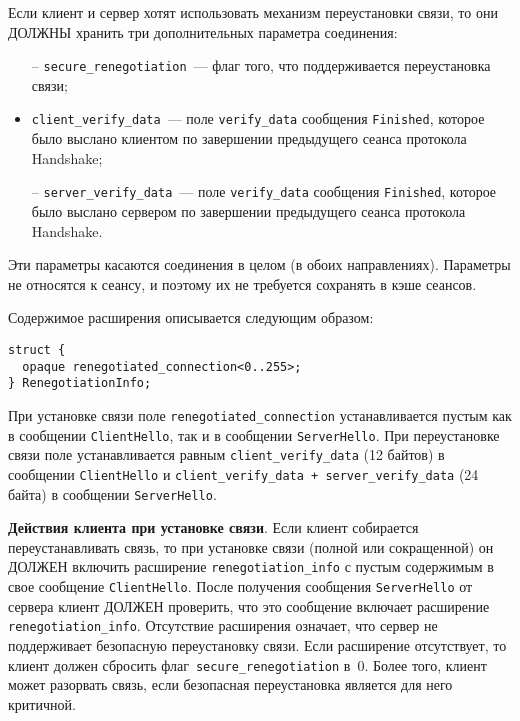 Если клиент и сервер хотят использовать механизм переустановки связи, то 
они ДОЛЖНЫ хранить три дополнительных параметра соединения: 
\begin{itemize}
\item[--]
\lstinline{secure_renegotiation}~--- флаг того, что поддерживается 
переустановка связи;

\item[--]
\lstinline{client_verify_data}~--- поле \lstinline{verify_data} 
сообщения \lstinline{Finished}, которое было выслано клиентом по 
завершении предыдущего сеанса протокола Handshake; 

\item[--]
\lstinline{server_verify_data}~--- поле \lstinline{verify_data} 
сообщения \lstinline{Finished}, которое было выслано сервером по 
завершении предыдущего сеанса протокола Handshake. 
\end{itemize}

Эти параметры касаются соединения в целом (в обоих направлениях). Параметры 
не относятся к сеансу, и поэтому их не требуется сохранять в кэше сеансов. 

Содержимое расширения описывается следующим образом:
\begin{lstlisting}
struct {
  opaque renegotiated_connection<0..255>;
} RenegotiationInfo;
\end{lstlisting}
                
При установке связи поле \lstinline{renegotiated_connection}
устанавливается пустым как в сообщении \lstinline{ClientHello}, так и в
сообщении \lstinline{ServerHello}. При переустановке связи поле
устанавливается равным \lstinline{client_verify_data} (12 байтов) в
сообщении \lstinline{ClientHello} и 
\lstinline{client_verify_data + server_verify_data} (24 байта) 
в сообщении \lstinline{ServerHello}.

{\bf Действия клиента при установке связи}. 
Если клиент собирается переустанавливать связь, то при установке связи 
(полной или сокращенной) он ДОЛЖЕН включить расширение 
\lstinline{renegotiation_info} с пустым содержимым в свое сообщение 
\lstinline{ClientHello}. После получения сообщения \lstinline{ServerHello} 
от сервера клиент ДОЛЖЕН проверить, что это сообщение включает расширение 
\lstinline{renegotiation_info}. 
%
Отсутствие расширения означает, что сервер не поддерживает безопасную 
переустановку связи. Если расширение отсутствует, то клиент должен сбросить 
флаг~\lstinline{secure_renegotiation} в~0. Более того, клиент может 
разорвать связь, если безопасная переустановка является для него критичной.

